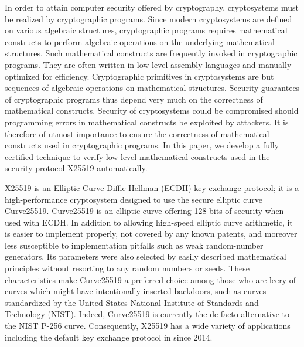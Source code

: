 
In order to attain computer security offered by cryptography,
cryptosystems must be realized by cryptographic programs. Since modern
cryptosystems are defined on various algebraic structures,
cryptographic programs requires mathematical constructs to perform
algebraic operations on the underlying mathematical structures.
Such mathematical constructs are frequently invoked in cryptographic
programs. They are often written in low-level assembly languages and
manually optimized for efficiency. Cryptographic primitives in
cryptosystems are but sequences of algebraic operations on
mathematical structures. Security guarantees of cryptographic programs
thus depend very much on the correctness of mathematical constructs.
Security of cryptosystems could be compromised should programming
errors in mathematical constructs be exploited by attackers. 
It is therefore of utmost importance to ensure the correctness of
mathematical constructs used in cryptographic programs. In this paper,
we develop a fully certified technique to verify low-level
mathematical constructs used in the security protocol X25519
automatically.

X25519 is an Elliptic Curve Diffie-Hellman (ECDH) key exchange
protocol; it is a high-performance cryptosystem designed to 
use the secure elliptic curve Curve25519. Curve25519 is an elliptic
curve offering 128 bits of security when used with ECDH. In addition
to allowing high-speed elliptic curve arithmetic, it is easier to
implement properly, not covered by any known patents, and moreover
less susceptible to implementation pitfalls such as weak 
random-number generators. Its parameters were also selected by
easily described mathematical principles without resorting to any
random numbers or seeds. These characteristics make Curve25519 a
preferred choice among those who are leery of curves which might have
intentionally inserted
backdoors, such as curves standardized by the United States National
Institute of Standards and Technology (NIST). 
Indeed, Curve25519 is currently the
de facto alternative to the NIST P-256 curve. Consequently, X25519 has
a wide variety of applications including the default key exchange
protocol in \openssh since 2014.

